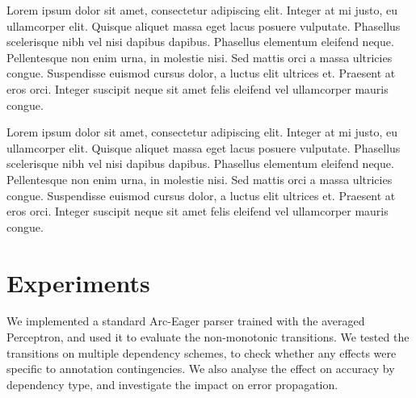 \documentclass[11pt,letterpaper]{article}
\begin{document}
Lorem ipsum dolor sit amet, consectetur adipiscing elit. Integer at mi justo, eu ullamcorper elit. Quisque aliquet massa eget lacus posuere vulputate. Phasellus scelerisque nibh vel nisi dapibus dapibus. Phasellus elementum eleifend neque. Pellentesque non enim urna, in molestie nisi. Sed mattis orci a massa ultricies congue. Suspendisse euismod cursus dolor, a luctus elit ultrices et. Praesent at eros orci. Integer suscipit neque sit amet felis eleifend vel ullamcorper mauris congue.

Lorem ipsum dolor sit amet, consectetur adipiscing elit. Integer at mi justo, eu ullamcorper elit. Quisque aliquet massa eget lacus posuere vulputate. Phasellus scelerisque nibh vel nisi dapibus dapibus. Phasellus elementum eleifend neque. Pellentesque non enim urna, in molestie nisi. Sed mattis orci a massa ultricies congue. Suspendisse euismod cursus dolor, a luctus elit ultrices et. Praesent at eros orci. Integer suscipit neque sit amet felis eleifend vel ullamcorper mauris congue.
\section{Experiments}

We implemented a standard Arc-Eager parser trained with the averaged Perceptron,
and used it to evaluate the non-monotonic transitions. We tested the transitions on
multiple dependency schemes, to check whether any effects were specific to annotation
contingencies. We also analyse the effect on accuracy by dependency type, and
investigate the impact on error propagation.
\end{document}
